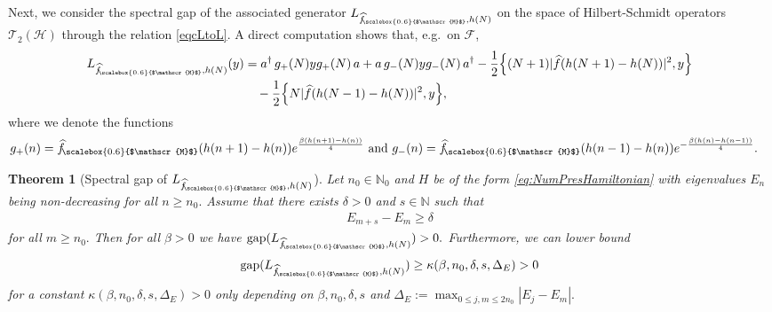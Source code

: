 \documentclass[11pt]{amsart}
\newcommand{\1}{\mathbbm{1}}
\newcommand{\N}{\mathbb{N}}
\newcommand{\hatfM}{\widehat{f}_{\!\scalebox{0.6}{$\mathscr{M}$}}
}
\newcommand{\bin}[1]{}
\theoremstyle{plain}
\newtheorem{theorem}{Theorem}[section]
\theoremstyle{definition}
\theoremstyle{remark}
\numberwithin{equation}{section}
\begin{document}
\noindent Next, we consider the spectral gap of the associated generator $L_{\hatfM,h(N)}$ on the space of Hilbert-Schmidt operators $\mathscr{T}_2(\mathcal{H})$ through the relation \eqref{eqcLtoL}.
A direct computation shows that, e.g.~on $\mathscr{F}$,
\begin{equation}
\label{eq:L22}
\begin{split}
  L_{\hatfM,h(N)}(y) &= a^\dagger\, g_+(N) y g_+(N)\,a  + a\,g_-(N) y g_-(N)\, a^\dagger -\frac{1}{2} \Big\{(N+1)|\widehat f(h(N+1)-h(N))|^2, y\Big\}\\&\quad-\frac{1}{2}\Big\{ N|\widehat f(h(N-1)-h(N))|^2,y\Big\},
\end{split}
\end{equation}
where we denote the functions
\begin{equation}
\begin{split}
    g_{+}(n) &= \hatfM(h(n+1)-h(n))e^{\frac{\beta(h(n+1)-h(n))}{4}}\text{ and }
    g_{-}(n) = \hatfM(h(n-1)-h(n))e^{-\frac{\beta(h(n)-h(n-1))}{4}}.
    \end{split}
\end{equation}

\begin{theorem}[Spectral gap of $L_{\hatfM,h(N)}$]
\label{thm:SpectralGapGeneralh(N)}
    Let $n_0\in\N_0$ and $H$ be of the form \eqref{eq:NumPresHamiltonian} with eigenvalues $E_n$ being non-decreasing for all $n\ge n_0.$ Assume that there exists $\delta>0$ and $s\in\N$ such that
\begin{align}
\label{eq:LowerboundEn+s-En}
    E_{m+s} -E_m \ge \delta
    \end{align}
    for all $m\ge n_0.$
    Then for all $\beta>0$ we have $\operatorname{gap}(L_{\hatfM,h(N)})>0.$ Furthermore, we can lower bound \begin{align}
    \label{eq:UniformGapBound}
    \operatorname{gap}(L_{\hatfM,h(N)}) \ge \kappa(\beta,n_0,\delta,s,\Delta_E) >0
\end{align}
for a constant $\kappa(\beta,n_0,\delta,s,\Delta_E)>0$ only depending on $\beta,n_0,\delta,s$ and $\Delta_E :=\max_{0\le j,m\le 2n_0} |E_j-E_m|.$
    \bin{Furthermore, for $n_0=0,$ i.e. $\left(E_n\right)_{n\in\N_0}$ being a non-decreasing sequence we have that $\operatorname{gap}(L)=\Omega(1)$ in the limit of large $\beta,$ i.e. for all $\beta'>0$ we have $\operatorname{gap}(L_{\widehat{f},h(N)})\ge C_{\beta'}$ for some $C_{\beta'}>0$ and all $\beta\in[\beta',\infty).$}
\end{theorem}
\end{document}
